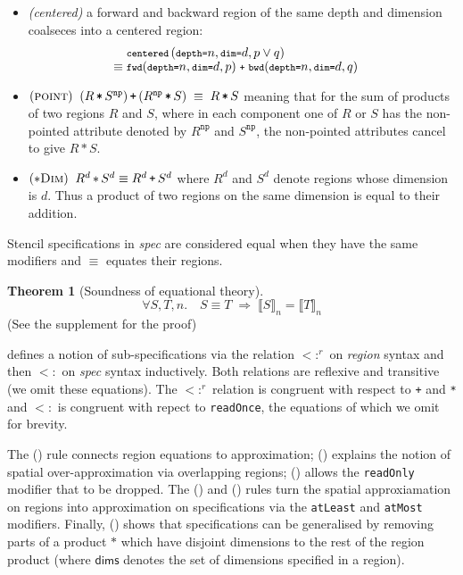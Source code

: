 \documentclass[10pt,preprint,numbers]{sigplanconf}
\newcounter{block}
\theoremstyle{definition}
\newtheorem{theorem}[block]{Theorem}
\newcommand{\interp}[1]{\llbracket{#1}\rrbracket}
\newcommand{\term}[1]{\texttt{#1}}
\newcommand{\stenCen}[3]{\term{centered} \, (\term{depth=}#1,
  \term{dim=}#2{#3})}
\newcommand{\irreflS}{\texttt{np}}
\newcommand{\stenFwdSR}[3]{\term{fwd} (\term{depth=}#1,
  \term{dim=}#2, #3)}
\newcommand{\stenBwdSR}[3]{\term{bwd} (\term{depth=}#1,
  \term{dim=}#2, #3)}
\newcommand{\trule}[1]{{\footnotesize{(\text{#1})}}}
\begin{document}
\begin{itemize}
\item \textit{(centered)} a forward and backward region of the same
  depth and dimension coalseces into a centered region:
%
\vspace{-0.4em}
\begin{align*}
\hspace{-1em} & {\small{\stenCen{n}{d}{, p \vee q}}} \\[-0.4em]
\hspace{-1em} \equiv \; & {\small{\stenFwdSR{n}{d}{p} \; \texttt{+} \;
                          \stenBwdSR{n}{d}{q}}}
\end{align*}
\vspace{-1.5em}

\item $(\textsc{point}) \;\; (R \, \term{*} \, S^\irreflS) \, \term{+} \,
                         (R^\irreflS \, \term{*} \, S) \; \equiv \; R
                         \, \term{*} \, S$
meaning that for the sum of products of two regions $R$ and $S$,
where in each component one of $R$ or $S$ has the non-pointed
attribute denoted by $R^{\term{np}}$ and $S^{\term{np}}$,
the non-pointed attributes cancel to give $R \, \term{*} \, S$.
%
\item $(\textsc{$\ast$Dim}) \;\; R^d \, \term{$\ast$} \, S^d \equiv R^d
                             \, \term{+} \, S^d$
%
where $R^d$ and $S^d$ denote regions whose dimension is $d$.
Thus a product of two regions on
the same dimension is equal to their addition.
\end{itemize}
%
Stencil specifications in \textit{spec} are considered
equal when they have the same modifiers and $\equiv$ equates
their regions.

\begin{theorem}[Soundness of equational theory]
\begin{equation*}
\forall S, T, n . \quad
S \equiv T \; \Rightarrow \;
\interp{S}_n = \interp{T}_n
\end{equation*}
(See the supplement for the proof)
\end{theorem}

 defines a notion of sub-specifications
via the relation $<:^r$ on \textit{region}
syntax and then $<:$ on \textit{spec} syntax inductively.
Both relations are reflexive and transitive (we omit
these equations). The $<:^r$ relation is congruent
with respect to \term{+} and \term{*} and $<:$ is congruent
with repect to \term{readOnce}, the equations of which we omit for brevity.

The \trule{\textsc{eq}} rule connects region
equations to approximation; \trule{\textsc{over}} explains
the notion of spatial over-approximation via overlapping regions;
\trule{\textsc{rep}} allows the \term{readOnly} modifier that
to be dropped. The \trule{\textsc{shrink}}
and \trule{\textsc{grow}} rules turn the spatial approxiamation on
regions into approximation on specifications via the \term{atLeast} and \term{atMost}
modifiers. Finally, \trule{\textsc{Gen$\ast$}} shows
that specifications can be generalised by removing parts of a product
$\ast$ which have disjoint dimensions to the rest of the region
product (where $\mathsf{dims}$ denotes the set of dimensions specified
in a region).
\end{document}
